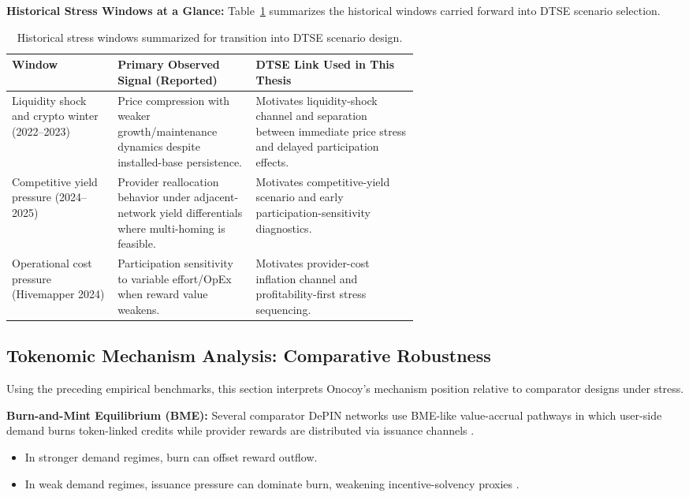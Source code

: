\noindent\textbf{Historical Stress Windows at a Glance:}
Table~\ref{tab:empirical_stress_windows_summary} summarizes the historical windows carried forward into DTSE scenario selection.
\begin{table}[ht]
    \centering
    \small
    \renewcommand{\arraystretch}{1.2}
    \begin{tabularx}{\textwidth}{@{}>{\raggedright\arraybackslash}p{0.26\linewidth}>{\raggedright\arraybackslash}p{0.34\linewidth}X@{}}
        \toprule
        \textbf{Window} & \textbf{Primary Observed Signal (Reported)} & \textbf{DTSE Link Used in This Thesis} \\
        \midrule
        Liquidity shock and crypto winter (2022--2023) & Price compression with weaker growth/maintenance dynamics despite installed-base persistence. & Motivates liquidity-shock channel and separation between immediate price stress and delayed participation effects. \\
        Competitive yield pressure (2024--2025) & Provider reallocation behavior under adjacent-network yield differentials where multi-homing is feasible. & Motivates competitive-yield scenario and early participation-sensitivity diagnostics. \\
        Operational cost pressure (Hivemapper 2024) & Participation sensitivity to variable effort/OpEx when reward value weakens. & Motivates provider-cost inflation channel and profitability-first stress sequencing. \\
        \bottomrule
    \end{tabularx}
    \caption{Historical stress windows summarized for transition into DTSE scenario design.}
    \label{tab:empirical_stress_windows_summary}
\end{table}

\subsection{Tokenomic Mechanism Analysis: Comparative Robustness}
Using the preceding empirical benchmarks, this section interprets Onocoy's mechanism position relative to comparator designs under stress.

\noindent\textbf{Burn-and-Mint Equilibrium (BME):}
Several comparator DePIN networks use BME-like value-accrual pathways in which user-side demand burns token-linked credits while provider rewards are distributed via issuance channels \cite{RenderBME}.
\begin{itemize}
    \item In stronger demand regimes, burn can offset reward outflow.
    \item In weak demand regimes, issuance pressure can dominate burn, weakening incentive-solvency proxies \cite{FrontiersDePIN2025, Lin2024}.
\end{itemize}

